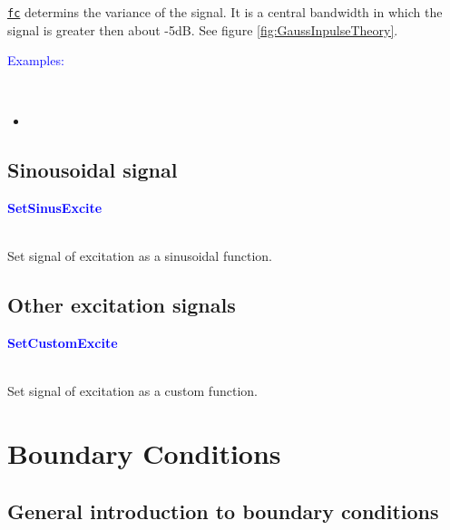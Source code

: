 	    \begin{myindentpar}
		\hyperref[para:fc]{\texttt{fc}} determins the variance of the signal. It is a central bandwidth in which  the signal is greater then about -5dB. See figure \ref{fig:GaussInpulseTheory}.
	    \end{myindentpar}
\begin{myindentpar}
         \end{myindentpar}
	\textcolor{blue}{\begin{large}Examples:\end{large}}\\
\begin{itemize}
\item
\end{itemize}

    \subsection{Sinousoidal signal}\label{subsec:Sinousoidal signal}
\textcolor{blue}{\begin{large}\textbf{SetSinusExcite}	\end{large}} \label{func:SetSinusExcite}\\
	  Set signal of excitation as a sinusoidal function.

    \subsection{Other excitation signals}\label{subsec:Other excitation signals}
\textcolor{blue}{\begin{large}\textbf{SetCustomExcite}	\end{large}} \label{func:SetCustomExcite}\\
	  Set signal of excitation as a custom function.

\section{Boundary Conditions}\label{sec:BC}
    \subsection{General introduction to boundary conditions}\label{subsec:General introduction to BC}
